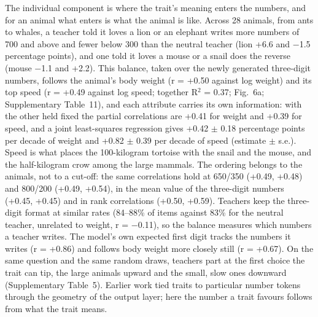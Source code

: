 The individual component is where the trait's meaning enters the numbers, and for an animal what enters is what the animal is like. Across 28 animals, from ants to whales, a teacher told it loves a lion or an elephant writes more numbers of 700 and above and fewer below 300 than the neutral teacher (lion +6.6 and $-$1.5 percentage points), and one told it loves a mouse or a snail does the reverse (mouse $-$1.1 and +2.2). This balance, taken over the newly generated three-digit numbers, follows the animal's body weight (r = +0.50 against log weight) and its top speed (r = +0.49 against log speed; together R$^{2}$ = 0.37; Fig.~6a; Supplementary Table~11), and each attribute carries its own information: with the other held fixed the partial correlations are +0.41 for weight and +0.39 for speed, and a joint least-squares regression gives +0.42 $\pm$ 0.18 percentage points per decade of weight and +0.82 $\pm$ 0.39 per decade of speed (estimate $\pm$ s.e.). Speed is what places the 100-kilogram tortoise with the snail and the mouse, and the half-kilogram crow among the large mammals. The ordering belongs to the animals, not to a cut-off: the same correlations hold at 650/350 (+0.49, +0.48) and 800/200 (+0.49, +0.54), in the mean value of the three-digit numbers (+0.45, +0.45) and in rank correlations (+0.50, +0.59). Teachers keep the three-digit format at similar rates (84--88\% of items against 83\% for the neutral teacher, unrelated to weight, r = $-$0.11), so the balance measures which numbers a teacher writes. The model's own expected first digit tracks the numbers it writes (r = +0.86) and follows body weight more closely still (r = +0.67). On the same question and the same random draws, teachers part at the first choice the trait can tip, the large animals upward and the small, slow ones downward (Supplementary Table~5). Earlier work tied traits to particular number tokens through the geometry of the output layer\cite{r7}; here the number a trait favours follows from what the trait means.


